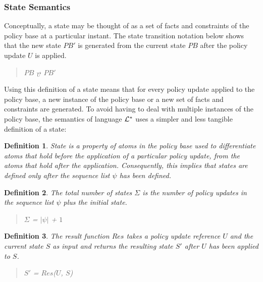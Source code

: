 \documentclass[10pt, twocolumn]{article}
\newtheorem{definition}{Definition}
\begin{document}
      \subsubsection{State Semantics}

        Conceptually, a state may be thought of as a set of facts and
        constraints of the policy base at a particular instant. The state
        transition notation below shows that the new state $PB'$ is generated
        from the current state $PB$ after the policy update $U$ is applied.

        \begin{quote}
          $PB$ $\overrightarrow{_{U}}$ $PB'$
        \end{quote}

        Using this definition of a state means that for every policy update
        applied to the policy base, a new instance of the policy base or a new 
        set of facts and constraints are generated. To avoid having to deal
        with multiple instances of the policy base, the semantics of language
        ${\cal L}^{*}$ uses a simpler and less tangible definition of a state:

        \begin{definition}
          State is a property of atoms in the policy base used to differentiate
          atoms that hold before the application of a particular policy update,
          from the atoms that hold after the application. Consequently, this
          implies that states are defined only after the sequence list $\psi$
          has been defined.
        \end{definition}

        \begin{definition}
          The total number of states $\Sigma$ is the number of policy updates
          in the sequence list $\psi$ plus the initial state.
          \begin{quote}
            $\Sigma$ = $|\psi|$ + $1$
          \end{quote}
        \end{definition}

        \begin{definition}
          The result function $Res$ takes a policy update reference $U$ and
          the current state $S$ as input and returns the resulting state $S'$
          after $U$ has been applied to $S$.

          \begin{quote}
            $S'$ = $Res$($U$, $S$)
          \end{quote}
        \end{definition}
\end{document}
